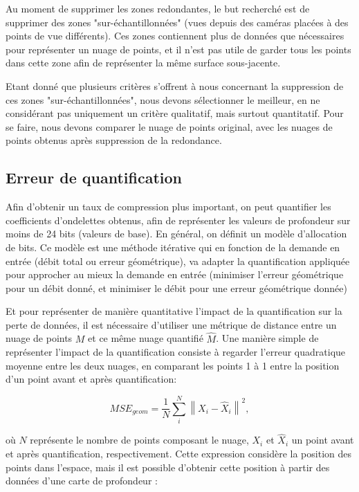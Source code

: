 \documentclass{report}
\newcommand{\norm}[1]{\left\lVert#1\right\rVert}
\begin{document}
Au moment de supprimer les zones redondantes, le but recherché est de supprimer des zones "sur-échantillonnées" (vues depuis des caméras placées à des points de vue différents).
Ces zones contiennent plus de données que nécessaires pour représenter un nuage de points, et il n'est pas utile de garder tous les points dans cette zone afin de représenter la même surface sous-jacente.

Etant donné que plusieurs critères s'offrent à nous concernant la suppression de ces zones "sur-échantillonnées", nous devons sélectionner le meilleur, en ne considérant pas uniquement un critère qualitatif, mais surtout quantitatif. Pour se faire, nous devons comparer le nuage de points original, avec les nuages de points obtenus après suppression de la redondance.

\subsection{Erreur de quantification} %

Afin d'obtenir un taux de compression plus important, on peut quantifier les coefficients d'ondelettes obtenus, afin de représenter les valeurs de profondeur sur moins de 24 bits (valeurs de base).
En général, on définit un modèle d'allocation de bits. Ce modèle est une méthode itérative qui en fonction de la demande en entrée (débit total ou erreur géométrique), va adapter la quantification appliquée pour approcher au mieux la demande en entrée (minimiser l'erreur géométrique pour un débit donné, et minimiser le débit pour une erreur géométrique donnée)

Et pour représenter de manière quantitative l'impact de la quantification sur la perte de données, il est nécessaire d'utiliser une métrique de distance entre un nuage de points $M$ et ce même nuage quantifié $\hat{M}$.
Une manière simple de représenter l'impact de la quantification consiste à regarder l'erreur quadratique moyenne entre les deux nuages, en comparant les points 1 à 1 entre la position d'un point avant et après quantification:

\begin{equation}
	MSE_{geom} = \frac{1}{N}\sum_i^N\norm{X_i-\hat{X}_i}^2 \label{eq:mse_geom},
\end{equation}

où $N$ représente le nombre de points composant le nuage, $X_i$ et $\hat{X}_i$ un point avant et après quantification, respectivement.
Cette expression considère la position des points dans l'espace, mais il est possible d'obtenir cette position à partir des données d'une carte de profondeur :
\end{document}
